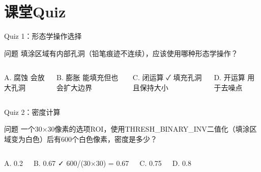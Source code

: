 \section{课堂Quiz}

\begin{frame}{Quiz 1：形态学操作选择}
    \begin{block}{问题}
    填涂区域有内部孔洞（铅笔痕迹不连续），应该使用哪种形态学操作？
    \end{block}

    \begin{columns}
        \begin{alertblock}{A. 腐蚀}
        会放大孔洞
        \end{alertblock}

        \begin{alertblock}{B. 膨胀}
        能填充但也会扩大边界
        \end{alertblock}

        \begin{exampleblock}{C. 闭运算 ✓}
        填充孔洞且保持大小
        \end{exampleblock}

        \begin{alertblock}{D. 开运算}
        用于去噪点
        \end{alertblock}
    \end{columns}
\end{frame}

\begin{frame}{Quiz 2：密度计算}
    \begin{block}{问题}
    一个30×30像素的选项ROI，使用THRESH\_BINARY\_INV二值化（填涂区域变为白色）后有600个白色像素，密度是多少？
    \end{block}

    \begin{columns}
        \begin{alertblock}{A. 0.2}
        \end{alertblock}

        \begin{exampleblock}{B. 0.67 ✓}
        600/(30×30) = 0.67
        \end{exampleblock}

        \begin{alertblock}{C. 0.75}
        \end{alertblock}

        \begin{alertblock}{D. 0.8}
        \end{alertblock}
    \end{columns}
\end{frame}

